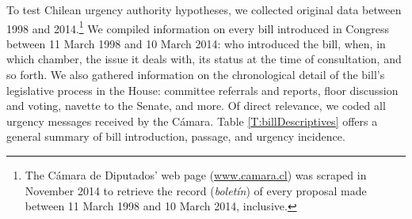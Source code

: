 \documentclass[letter,12pt]{article}
\newcommand{\vp}[1]{\todo[color=green!15, inline]{\textbf{Vale:} #1}}
\begin{document}
To test Chilean urgency authority hypotheses, we collected original data between 1998 and 2014.\footnote{The Cámara de Diputados' web page (\url{www.camara.cl}) was scraped in November 2014 to retrieve the record (\emph{boletín}) of every proposal made between 11 March 1998 and 10 March 2014, inclusive.} We compiled information on every bill introduced in Congress between 11 March 1998 and 10 March 2014: who introduced the bill, when, in which chamber, the issue it deals with, its status at the time of consultation, and so forth. We also gathered information on the chronological detail of the bill's legislative process in the House: committee referrals and reports, floor discussion and voting, navette to the Senate, and more. Of direct relevance, we coded all urgency messages received by the Cámara. Table \ref{T:billDescriptives} offers a general summary of bill introduction, passage, and urgency incidence.

\end{document}

